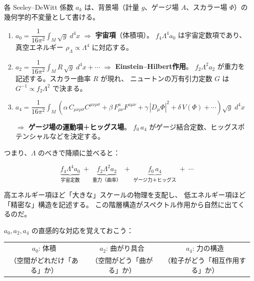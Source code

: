\documentclass[11pt,a4paper]{article}
\theoremstyle{definition}
\begin{document}
各 Seeley--DeWitt 係数 $a_k$ は、背景場（計量 $g$、ゲージ場 $A$、スカラー場 $\Phi$）の
幾何学的不変量として書ける。

\begin{keybox}
\begin{enumerate}
  \item $a_0 = \dfrac{1}{16\pi^2}\displaystyle\int_M \sqrt{g}\; d^4x$
  \quad $\Longrightarrow$ \quad\textbf{宇宙項}（体積項）。
  $f_4\Lambda^4 a_0$ は宇宙定数項であり、
  真空エネルギー $\rho_\Lambda \propto \Lambda^4$ に対応する。

  \item $a_2 = \dfrac{1}{16\pi^2}\displaystyle\int_M R\,\sqrt{g}\; d^4x + \cdots$
  \quad $\Longrightarrow$ \quad\textbf{Einstein--Hilbert作用}。
  $f_2\Lambda^2 a_2$ が重力を記述する。スカラー曲率 $R$ が現れ、
  ニュートンの万有引力定数 $G$ は $G^{-1} \propto f_2 \Lambda^2$ で決まる。

  \item $a_4 = \dfrac{1}{16\pi^2}\displaystyle\int_M
  \left(\alpha\, C_{\mu\nu\rho\sigma}C^{\mu\nu\rho\sigma}
        + \beta\, F_{\mu\nu}^a F^{a\mu\nu}
        + \gamma\, |D_\mu\Phi|^2
        + \delta\, V(\Phi)
        + \cdots\right)\sqrt{g}\; d^4x$

  $\Longrightarrow$ \quad\textbf{ゲージ場の運動項}＋\textbf{ヒッグス場}。
  $f_0\, a_4$ がゲージ結合定数、ヒッグスポテンシャルなどを決定する。
\end{enumerate}
\end{keybox}

\noindent つまり、$\Lambda$ のべきで降順に並べると：

\[
  \underbrace{f_4\Lambda^4 a_0}_{\text{宇宙定数}}
  \;+\; \underbrace{f_2\Lambda^2 a_2}_{\text{重力（曲率）}}
  \;+\; \underbrace{f_0\, a_4}_{\text{ゲージ力＋ヒッグス}}
  \;+\; \cdots
\]

高エネルギー項ほど「大きな」スケールの物理を支配し、
低エネルギー項ほど「精密な」構造を記述する。
この階層構造がスペクトル作用から自然に出てくるのだ。

\begin{hsbox}
$a_0, a_2, a_4$ の直感的な対応を覚えておこう：
\begin{center}
\begin{tabular}{ccc}
  $a_0$: 体積 & $a_2$: 曲がり具合 & $a_4$: 力の構造 \\
  （空間がどれだけ「ある」か） & （空間がどう「曲がる」か） & （粒子がどう「相互作用する」か）
\end{tabular}
\end{center}
\end{hsbox}
\end{document}
